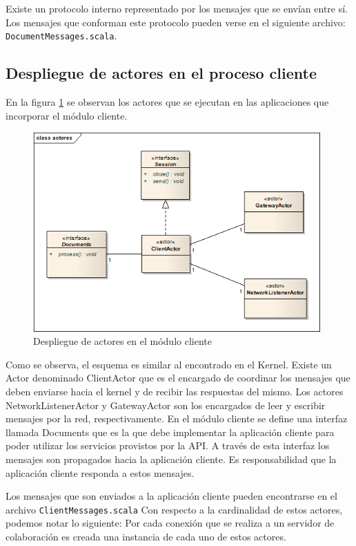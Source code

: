 \documentclass[12pt,a4paper]{article}
\begin{document}
Existe un protocolo interno representado por los mensajes que se envían entre sí. Los mensajes que conforman este protocolo
pueden verse en el siguiente archivo: \texttt{DocumentMessages.scala}.

\subsection{Despliegue de actores en el proceso cliente}
En la figura \ref{actores-cliente} se observan los actores que se ejecutan en las aplicaciones que incorporar el módulo cliente.

	\begin{figure}[!ht]
		\begin{center}
			\includegraphics[width=11cm]{actores-cliente.png}
			\caption{\label{actores-cliente} Despliegue de actores en el módulo cliente }
		\end{center}
	\end{figure}

Como se observa, el esquema es similar al encontrado en el Kernel. Existe un Actor denominado ClientActor que es el
encargado de coordinar los mensajes que deben enviarse hacia el kernel y de recibir las respuestas del mismo.
Los actores NetworkListenerActor y GatewayActor son los encargados de leer y escribir mensajes por la red, respectivamente.
En el módulo cliente se define una interfaz llamada Documents que es la que debe implementar la aplicación cliente para poder
utilizar los servicios provistos por la API.
A través de esta interfaz los mensajes son propagados hacia la aplicación cliente. Es responsabilidad que la aplicación cliente
responda a estos mensajes.

Los mensajes que son enviados a la aplicación cliente pueden encontrarse en el archivo 
\texttt{ClientMessages.scala}
Con respecto a la cardinalidad de estos actores, podemos notar lo siguiente:
Por cada conexión que se realiza a un servidor de colaboración es creada una instancia de cada uno de estos actores.
\end{document}
